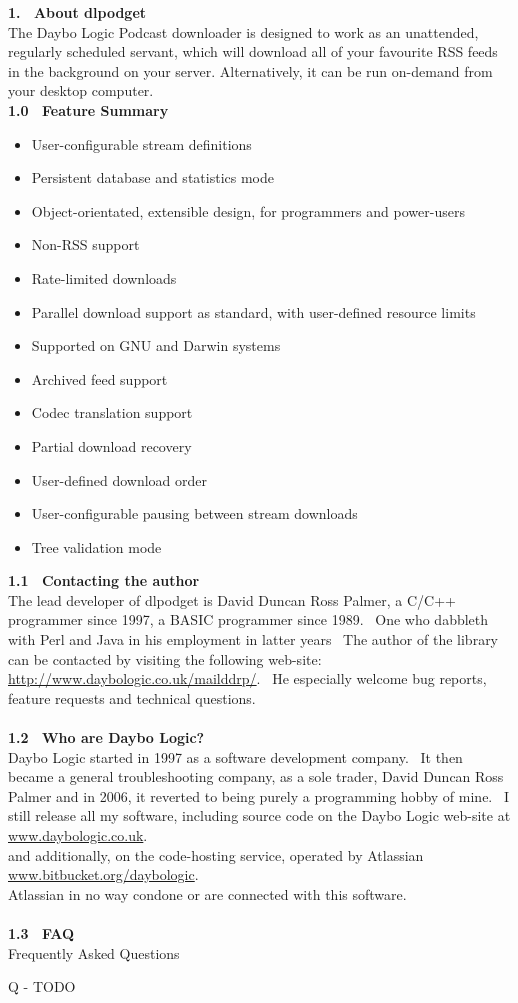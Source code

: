 \documentclass{article}
\begin{document}
\newpage
\textbf{1.~ About dlpodget}
\\
The Daybo Logic Podcast downloader is designed to work as an unattended, regularly scheduled servant, which
will download all of your favourite RSS feeds in the background on your server.  Alternatively, it can be run
on-demand from your desktop computer.
\\
\textbf{1.0~ Feature Summary}
\begin{itemize}
\item User-configurable stream definitions
\item Persistent database and statistics mode
\item Object-orientated, extensible design, for programmers and power-users
\item Non-RSS support
\item Rate-limited downloads
\item Parallel download support as standard, with user-defined resource limits
\item Supported on GNU and Darwin systems
\item Archived feed support
\item Codec translation support
\item Partial download recovery
\item User-defined download order
\item User-configurable pausing between stream downloads
\item Tree validation mode
\end{itemize}
\textbf{1.1~ Contacting the author}
\\
The lead developer of dlpodget is David Duncan Ross Palmer, a C/C++
programmer since 1997, a BASIC programmer since 1989.  ~One who dabbleth with Perl and Java in his employment in latter years~
The author of the library can be contacted by visiting
the following web-site: \href{http://www.daybologic.co.uk/mailddrp/}{\url{http://www.daybologic.co.uk/mailddrp/}}.~
He especially welcome bug reports, feature requests and technical
questions.\\
\\
\textbf{1.2~ Who are Daybo Logic?}
\\
Daybo Logic started in 1997 as a software development company.~ It
then became a general troubleshooting company, as a sole trader, David
Duncan Ross Palmer and in 2006, it reverted to being purely a
programming hobby of mine.~ I still release all my software,
including source code on the Daybo Logic web-site at \href{http://www.daybologic.co.uk/}{www.daybologic.co.uk}.\\
and additionally, on the code-hosting service, operated by Atlassian
\href{https://bitbucket.org/daybologic}{www.bitbucket.org/daybologic}.\\
Atlassian in no way condone or are connected with this software.\\
\\
\textbf{1.3~ FAQ}
\\
Frequently Asked Questions
\\
\par Q - TODO
\end{document}
